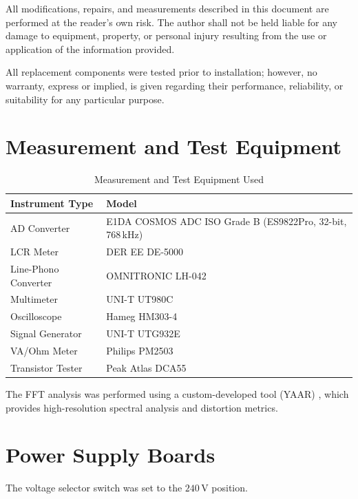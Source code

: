 \documentclass[]{article}
\begin{document}
All modifications, repairs, and measurements described in this document are performed at the reader's own risk. The author shall not be held liable for any damage to equipment, property, or personal injury resulting from the use or application of the information provided.

All replacement components were tested prior to installation; however, no warranty, express or implied, is given regarding their performance, reliability, or suitability for any particular purpose.

\section{Measurement and Test Equipment}

\begin{table}[H]
	\centering
	\caption{Measurement and Test Equipment Used}
	\label{tab:tools}
	\begin{tabular}{ll}
		\hline
		\textbf{Instrument Type} & \textbf{Model} \\
		\hline
		AD Converter & E1DA COSMOS ADC ISO Grade B (ES9822Pro, 32-bit, 768\,kHz) \\
		LCR Meter & DER EE DE-5000 \\
		Line-Phono Converter & OMNITRONIC LH-042 \\
		Multimeter & UNI-T UT980C \\
		Oscilloscope & Hameg HM303-4 \\
		Signal Generator & UNI-T UTG932E \\
		VA/Ohm Meter & Philips PM2503 \\
        Transistor Tester & Peak Atlas DCA55 \\
		\hline
	\end{tabular}
\end{table}

The FFT analysis was performed using a custom-developed tool (YAAR) \cite{yaar}, which provides high-resolution spectral analysis and distortion metrics.

\section{Power Supply Boards}

The voltage selector switch was set to the $240\,\mathrm{V}$ position.
\end{document}
